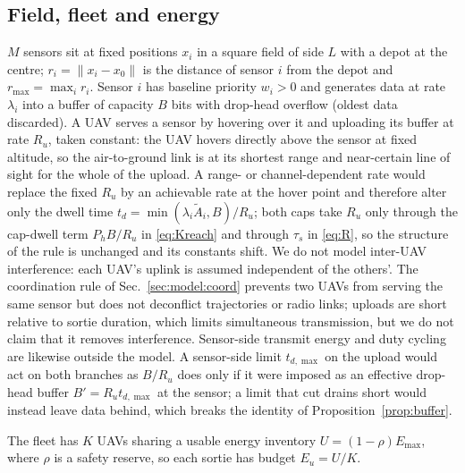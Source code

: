 \documentclass[journal,outdir=./]{IEEEtran}
\newcommand{\rmax}{r_{\max}}
\newcommand{\Ph}{P_{h}}
\newcommand{\Emax}{E_{\max}}
\newcommand{\Eu}{E_{u}}
\newcommand{\Ru}{R_u}
\begin{document}
\subsection{Field, fleet and energy}
$M$ sensors sit at fixed positions $x_i$ in a square field of side $L$ with a depot at the centre; $r_i=\|x_i-x_0\|$ is the distance of sensor $i$ from the depot and $\rmax=\max_i r_i$. Sensor $i$ has baseline priority $w_i>0$ and generates data at rate $\lambda_i$ into a buffer of capacity $B$ bits with drop-head overflow (oldest data discarded). A UAV serves a sensor by hovering over it and uploading its buffer at rate $\Ru$, taken constant: the UAV hovers directly above the sensor at fixed altitude, so the air-to-ground link is at its shortest range and near-certain line of sight for the whole of the upload. A range- or channel-dependent rate would replace the fixed $\Ru$ by an achievable rate at the hover point and therefore alter only the dwell time $t_d=\min(\lambda_i\tilde A_i,B)/\Ru$; both caps take $\Ru$ only through the cap-dwell term $\Ph B/\Ru$ in \eqref{eq:Kreach} and through $\tau_s$ in \eqref{eq:R}, so the structure of the rule is unchanged and its constants shift. We do not model inter-UAV interference: each UAV's uplink is assumed independent of the others'. The coordination rule of Sec.~\ref{sec:model:coord} prevents two UAVs from serving the same sensor but does not deconflict trajectories or radio links; uploads are short relative to sortie duration, which limits simultaneous transmission, but we do not claim that it removes interference. Sensor-side transmit energy and duty cycling are likewise outside the model. A sensor-side limit $t_{d,\max}$ on the upload would act on both branches as $B/\Ru$ does only if it were imposed as an effective drop-head buffer $B'=\Ru t_{d,\max}$ at the sensor; a limit that cut drains short would instead leave data behind, which breaks the identity of Proposition~\ref{prop:buffer}.

The fleet has $K$ UAVs sharing a usable energy inventory $U=(1-\rho)\Emax$, where $\rho$ is a safety reserve, so each sortie has budget $\Eu=U/K$.
\end{document}
